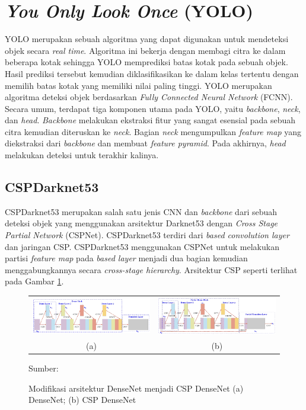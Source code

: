 \section{\textit{You Only Look Once} (YOLO)}
YOLO merupakan sebuah algoritma yang dapat digunakan untuk mendeteksi objek secara \textit{real time}. Algoritma ini bekerja dengan membagi citra ke dalam beberapa kotak sehingga YOLO memprediksi batas kotak pada sebuah objek. Hasil prediksi tersebut kemudian diklasifikasikan ke dalam kelas tertentu dengan memilih batas kotak yang memiliki nilai paling tinggi. YOLO merupakan algoritma deteksi objek berdasarkan \textit{Fully Connected Neural Network} (FCNN). Secara umum, terdapat tiga komponen utama pada YOLO, yaitu \textit{backbone}, \textit{neck}, dan \textit{head}. \textit{Backbone} melakukan ekstraksi fitur yang sangat esensial pada sebuah citra kemudian diteruskan ke \textit{neck}. Bagian \textit{neck} mengumpulkan \textit{feature map} yang diekstraksi dari \textit{backbone} dan membuat \textit{feature pyramid}. Pada akhirnya, \textit{head} melakukan deteksi untuk terakhir kalinya.

    \subsection{CSPDarknet53}
    CSPDarknet53 merupakan salah satu jenis CNN dan \textit{backbone} dari sebuah deteksi objek yang menggunakan arsitektur Darknet53 dengan \textit{Cross Stage Partial Network} (CSPNet). CSPDarknet53 terdiri dari \textit{based convolution layer} dan jaringan CSP. CSPDarknet53 menggunakan CSPNet untuk melakukan partisi \textit{feature map} pada \textit{based layer} menjadi dua bagian kemudian menggabungkannya secara \textit{cross-stage hierarchy}. Arsitektur CSP seperti terlihat pada Gambar \ref{fig:cspnet}.

    \begin{figure}[H]
        \centering
        \begin{tabular}{cc}
            \includegraphics[width=7cm]{../img/DenseNet - Latex.PNG}
            &
            \includegraphics[width=7cm]{../img/CSP DenseNet - Latex.PNG}\\
            (a) &(b)\\
        \end{tabular}
        \caption{Modifikasi arsitektur DenseNet menjadi CSP DenseNet (a) DenseNet; (b) CSP DenseNet}
        \label{fig:cspnet}
        Sumber: \citep{Wang2020}
    \end{figure}

